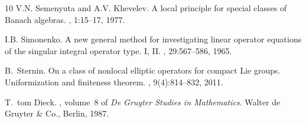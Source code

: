 \documentclass[11pt,a4paper]{amsart}
\newcommand\<{\langle}
\renewcommand\>{\rangle}
\theoremstyle{definition}
\begin{document}
\begin{thebibliography}{10}
V.N. Semenyuta and A.V. Khevelev.
\newblock A local principle for special classes of {B}anach algebras.
, 1:15--17, 1977.

I.B. Simonenko.
\newblock A new general method for investigating linear operator equations of
  the singular integral operator type. {I}, {II}.
, 29:567--586, 1965.

B.~Sternin.
\newblock On a class of nonlocal elliptic operators for compact {L}ie groups.
  {U}niformization and finiteness theorem.
, 9(4):814--832, 2011.

T.~{t}om Dieck.
, volume~8 of {\em De Gruyter Studies in
  Mathematics}.
\newblock Walter de Gruyter \& Co., Berlin, 1987.

\end{thebibliography}
\end{document}
